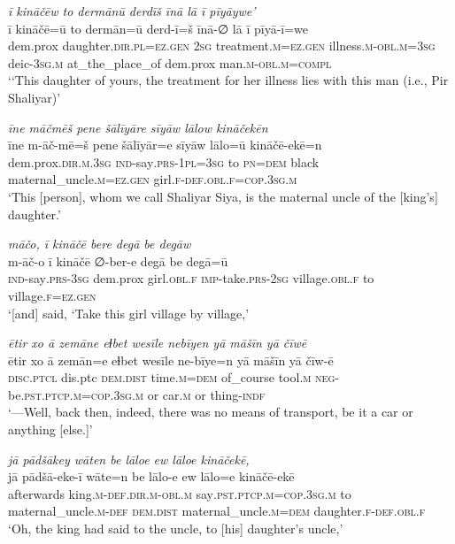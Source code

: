 \ea \label{ZP.33}
\textit{ī kināčēw to dermānū derdīš īnā lā ī pīyāywe’} \\ 
\gll ī kināčē=ū to dermān=ū derd-ī=š īnā-∅ lā ī pīyā-ī=we \\ 
 dem.prox daughter\textsc{.dir}\textsc{.pl}\textsc{\textsc{=ez.gen}} \textsc{2sg} treatment\textsc{.m}\textsc{\textsc{=ez.gen}} illness\textsc{.m}\textsc{-obl}\textsc{.m}\textsc{=3sg} deic\textsc{-3sg}\textsc{.m} at\_the\_place\_of dem.prox man\textsc{.m}\textsc{-obl}\textsc{.m}\textsc{=compl} \\ 
\glt `‘This daughter of yours, the treatment for her illness lies with this man (i.e., Pir Shaliyar)'
\z 
 
\ea \label{ZP.36}
\textit{īne māčmēš pene šālīyāre sīyāw lālow kināčekēn} \\ 
\gll īne m-āč-mē=š pene šālīyār=e sīyāw lālo=ū kināčē-ekē=n \\ 
 dem.prox\textsc{.dir}\textsc{.m}\textsc{.3sg} \textsc{ind-}say\textsc{.prs}\textsc{-1pl}\textsc{=3sg} to \textsc{pn}\textsc{=dem} black maternal\_uncle\textsc{.m}\textsc{\textsc{=ez.gen}} girl\textsc{.f}\textsc{-def}\textsc{.obl}\textsc{.f}\textsc{=cop}\textsc{.3sg}\textsc{.m} \\ 
\glt `This [person], whom we call Shaliyar Siya, is the maternal uncle of the [king’s] daughter.'
\z 
 
\ea \label{ZP.39}
\textit{māčo, ī kināčē bere degā be degāw} \\ 
\gll m-āč-o ī kināčē ∅-ber-e degā be degā=ū \\ 
 \textsc{ind-}say\textsc{.prs}\textsc{-3sg} dem.prox girl\textsc{.obl}\textsc{.f} \textsc{imp-}take\textsc{.prs}-\textsc{2sg} village\textsc{.obl}\textsc{.f} to village\textsc{.f}\textsc{\textsc{=ez.gen}} \\ 
\glt `[and] said, ‘Take this girl village by village,'
\z 
 
\ea \label{ZP.40}
\textit{ētir xo ā zemāne eɫbet wesīle nebīyen yā māšīn yā čīwē} \\ 
\gll ētir xo ā zemān=e eɫbet wesīle ne-bīye=n yā māšīn yā čīw-ē \\ 
 \textsc{disc.ptcl} dis.ptc \textsc{dem.dist} time\textsc{.m}\textsc{=dem} of\_course tool\textsc{.m} \textsc{neg-}be\textsc{.pst}\textsc{.ptcp}\textsc{.m}\textsc{=cop}\textsc{.3sg}\textsc{.m} or car\textsc{.m} or thing\textsc{-indf} \\ 
\glt `—Well, back then, indeed, there was no means of transport, be it a car or anything [else.]'
\z 
 
\ea \label{ZP.43}
\textit{jā pādšākey wāten be lāloe ew lāloe kināčekē,} \\ 
\gll jā pādšā-eke-ī wāte=n be lālo-e ew lālo=e kināčē-ekē \\ 
 afterwards king\textsc{.m}\textsc{-def}\textsc{.dir}\textsc{.m}\textsc{-obl}\textsc{.m} say\textsc{.pst}\textsc{.ptcp}\textsc{.m}\textsc{=cop}\textsc{.3sg}\textsc{.m} to maternal\_uncle\textsc{.m}\textsc{-def} \textsc{dem.dist} maternal\_uncle\textsc{.m}\textsc{=dem} daughter\textsc{.f}\textsc{-def}\textsc{.obl}\textsc{.f} \\ 
\glt `Oh, the king had said to the uncle, to [his] daughter’s uncle,'
\z 
 
